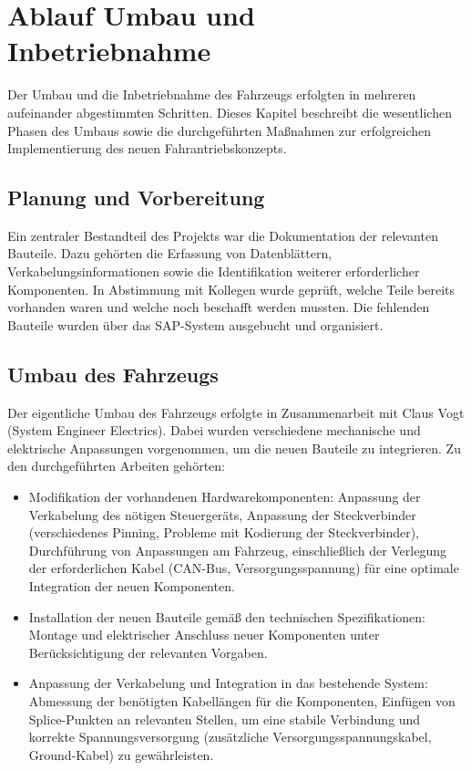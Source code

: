 \documentclass[a4paper, 12pt]{article} %
\begin{document}
\section{Ablauf Umbau und Inbetriebnahme}
\begin{spacing}{1.5}  %
    \fontsize{14pt}{14pt}\selectfont  %

Der Umbau und die Inbetriebnahme des Fahrzeugs erfolgten in mehreren aufeinander abgestimmten Schritten. 
 Dieses Kapitel beschreibt die wesentlichen Phasen des Umbaus sowie die durchgeführten 
Maßnahmen zur erfolgreichen Implementierung des neuen Fahrantriebskonzepts. 

\subsection{Planung und Vorbereitung}
Ein zentraler Bestandteil des Projekts war die Dokumentation der relevanten Bauteile. Dazu gehörten die Erfassung von Datenblättern,
 Verkabelungsinformationen sowie die Identifikation weiterer erforderlicher Komponenten. In Abstimmung mit Kollegen wurde geprüft, 
 welche Teile bereits vorhanden waren und welche noch beschafft werden mussten. Die fehlenden Bauteile wurden über das \ac{SAP}-System ausgebucht 
 und organisiert.

 \subsection{Umbau des Fahrzeugs}
 Der eigentliche Umbau des Fahrzeugs erfolgte in Zusammenarbeit mit Claus Vogt (System Engineer Electrics). Dabei wurden verschiedene
 mechanische und elektrische Anpassungen vorgenommen, um die neuen Bauteile zu integrieren. 
 Zu den durchgeführten Arbeiten gehörten:
 
    \begin{itemize}
        \item Modifikation der vorhandenen Hardwarekomponenten: Anpassung der Verkabelung des nötigen Steuergeräts, Anpassung der Steckverbinder (verschiedenes Pinning, Probleme mit Kodierung der Steckverbinder), Durchführung von Anpassungen am Fahrzeug, einschließlich der Verlegung der erforderlichen Kabel (\acf{CAN}-Bus, Versorgungsspannung) für eine optimale Integration der neuen Komponenten.
        \item Installation der neuen Bauteile gemäß den technischen Spezifikationen: Montage und elektrischer Anschluss neuer Komponenten unter Berücksichtigung der relevanten Vorgaben.
        \item Anpassung der Verkabelung und Integration in das bestehende System: Abmessung der benötigten Kabellängen für die Komponenten, Einfügen von Splice-Punkten an relevanten Stellen, um eine stabile Verbindung und korrekte Spannungsversorgung (zusätzliche Versorgungsspannungskabel, Ground-Kabel) zu gewährleisten.
    \end{itemize}


\end{spacing}
\end{document}
